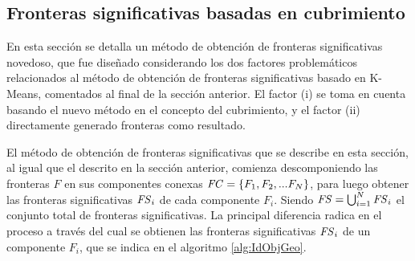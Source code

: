 

\subsection{Fronteras significativas basadas en cubrimiento}\label{subsec:MiSimp}
En esta sección se detalla un método de obtención de fronteras significativas novedoso,
que fue diseñado considerando los dos factores problemáticos relacionados al
método de obtención de fronteras significativas basado en K-Means, comentados
al final de la sección anterior. El factor (i) se toma en cuenta basando el
nuevo método en el concepto del cubrimiento, y el factor (ii) directamente
generado fronteras como resultado.

El método de obtención de fronteras significativas que se describe en esta sección, al igual que el
descrito en la sección anterior, comienza descomponiendo las fronteras $F$ en
sus componentes conexas $\mathit{FC}=\{F_1,F_2,...F_N\}$, para luego obtener las
fronteras significativas $\mathit{FS}_i$ de cada componente $F_i$. Siendo
$\mathit{FS} = \bigcup^N_{i=1} \mathit{FS}_i$ el conjunto total de fronteras
significativas. La principal diferencia radica en el proceso a través del cual
se obtienen las fronteras significativas $\mathit{FS}_i$ de un componente $F_i$, que
se indica en el algoritmo \ref{alg:IdObjGeo}.

